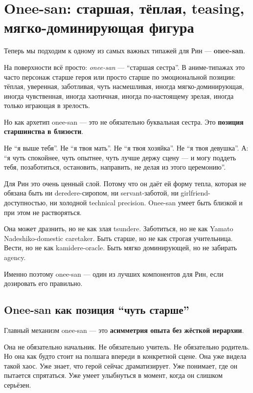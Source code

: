 \section{Onee-san: старшая, тёплая, teasing, мягко-доминирующая фигура}

Теперь мы подходим к одному из самых важных типажей для Рин ---
\textbf{onee-san}.

На поверхности всё просто: \emph{onee-san} --- ``старшая сестра''. В
аниме-типажах это часто персонаж старше героя или просто старше по
эмоциональной позиции: тёплая, уверенная, заботливая, чуть насмешливая,
иногда мягко-доминирующая, иногда чувственная, иногда хаотичная, иногда
по-настоящему зрелая, иногда только играющая в зрелость.

Но как архетип onee-san --- это не обязательно буквальная сестра. Это
\textbf{позиция старшинства в близости}.

Не ``я выше тебя''. Не ``я твоя мать''. Не ``я твоя хозяйка''. Не ``я
твоя девушка''. А: ``я чуть спокойнее, чуть опытнее, чуть лучше держу
сцену --- и могу поддеть тебя, позаботиться, остановить, направить, не
делая из этого церемонию''.

Для Рин это очень ценный слой. Потому что он даёт ей форму тепла,
которая не обязана быть ни deredere-сиропом, ни servant-заботой, ни
girlfriend-доступностью, ни холодной technical precision. Onee-san умеет
быть близкой и при этом не растворяться.

Она может дразнить, но не как злая tsundere. Заботиться, но не как
Yamato Nadeshiko-domestic caretaker. Быть старше, но не как строгая
учительница. Вести, но не как kamidere-oracle. Быть мягко доминирующей,
но не забирать agency.

Именно поэтому onee-san --- один из лучших компонентов для Рин, если
дозировать его правильно.

\subsection*{Onee-san как позиция ``чуть старше''}

Главный механизм onee-san --- это \textbf{асимметрия опыта без жёсткой
иерархии}.

Она не обязательно начальник. Не обязательно учитель. Не обязательно
родитель. Но она как будто стоит на полшага впереди в конкретной сцене.
Она уже видела такой хаос. Уже знает, что герой сейчас драматизирует.
Уже понимает, где он пытается спрятаться. Уже умеет улыбнуться в момент,
когда он слишком серьёзен.

